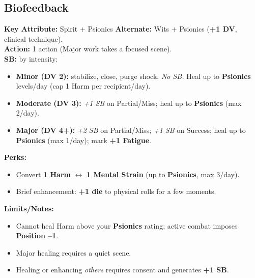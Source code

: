 \documentclass[11pt,twoside]{article}
\begin{document}

\subsection{Biofeedback}
\textbf{Key Attribute:} Spirit $+$ Psionics \quad
\textbf{Alternate:} Wits $+$ Psionics (\textbf{+1 DV}, clinical technique). \\
\textbf{Action:} 1 action (Major work takes a focused scene). \\
\textbf{SB:} by intensity:
\begin{itemize}[leftmargin=*]
  \item \textbf{Minor (DV 2):} stabilize, close, purge shock. \emph{No SB.} Heal up to \textbf{Psionics} levels/day (cap 1 Harm per recipient/day).
  \item \textbf{Moderate (DV 3):} \emph{+1 SB} on Partial/Miss; heal up to \textbf{Psionics} (max 2/day).
  \item \textbf{Major (DV 4+):} \emph{+2 SB} on Partial/Miss; \emph{+1 SB} on Success; heal up to \textbf{Psionics} (max 1/day); mark \textbf{+1 Fatigue}.
\end{itemize}
\textbf{Perks:}
\begin{itemize}[leftmargin=*]
  \item Convert \textbf{1 Harm} $\leftrightarrow$ \textbf{1 Mental Strain} (up to \textbf{Psionics}, max 3/day).
  \item Brief enhancement: \textbf{+1 die} to physical rolls for a few moments.
\end{itemize}
\textbf{Limits/Notes:}
\begin{itemize}[leftmargin=*]
  \item Cannot heal Harm above your \textbf{Psionics} rating; active combat imposes \textbf{Position --1}.
  \item Major healing requires a quiet scene.
  \item Healing or enhancing \emph{others} requires consent and generates \textbf{+1 SB}.
\end{itemize}

\end{document}
